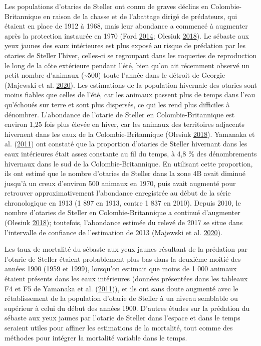 \documentclass[11pt]{book}
\begin{document}
Les populations d'otaries de Steller ont connu de graves déclins en Colombie-Britannique en raison de la chasse et de l'abattage dirigé de prédateurs, qui étaient en place de 1912 à 1968, mais leur abondance a commencé à augmenter après la protection instaurée en 1970 (Ford \protect\hyperlink{ref-ford2014}{2014}; Olesiuk \protect\hyperlink{ref-olesiuk2018}{2018}). Le sébaste aux yeux jaunes des eaux intérieures est plus exposé au risque de prédation par les otaries de Steller l'hiver, celles-ci se regroupant dans les roqueries de reproduction le long de la côte extérieure pendant l'été, bien qu'on ait récemment observé un petit nombre d'animaux (\textasciitilde500) toute l'année dans le détroit de Georgie (Majewski et al. \protect\hyperlink{ref-majewski2020}{2020}). Les estimations de la population hivernale des otaries sont moins fiables que celles de l'été, car les animaux passent plus de temps dans l'eau qu'échoués sur terre et sont plus dispersés, ce qui les rend plus difficiles à dénombrer. L'abondance de l'otarie de Steller en Colombie-Britannique est environ 1,25 fois plus élevée en hiver, car les animaux des territoires adjacents hivernent dans les eaux de la Colombie-Britannique (Olesiuk \protect\hyperlink{ref-olesiuk2018}{2018}). Yamanaka et al. (\protect\hyperlink{ref-yamanaka2011}{2011}) ont constaté que la proportion d'otaries de Steller hivernant dans les eaux intérieures était assez constante au fil du temps, à 4,8 \% des dénombrements hivernaux dans le sud de la Colombie-Britannique. En utilisant cette proportion, ils ont estimé que le nombre d'otaries de Steller dans la zone 4B avait diminué jusqu'à un creux d'environ 500 animaux en 1970, puis avait augmenté pour retrouver approximativement l'abondance enregistrée au début de la série chronologique en 1913 (1 897 en 1913, contre 1 837 en 2010). Depuis 2010, le nombre d'otaries de Steller en Colombie-Britannique a continué d'augmenter (Olesiuk \protect\hyperlink{ref-olesiuk2018}{2018}); toutefois, l'abondance estimée du relevé de 2017 se situe dans l'intervalle de confiance de l'estimation de 2013 (Majewski et al. \protect\hyperlink{ref-majewski2020}{2020}).

Les taux de mortalité du sébaste aux yeux jaunes résultant de la prédation par l'otarie de Steller étaient probablement plus bas dans la deuxième moitié des années 1900 (1959 et 1999), lorsqu'on estimait que moins de 1 000 animaux étaient présents dans les eaux intérieures (données présentées dans les tableaux F4 et F5 de Yamanaka et al. (\protect\hyperlink{ref-yamanaka2011}{2011})), et ils ont sans doute augmenté avec le rétablissement de la population d'otarie de Steller à un niveau semblable ou supérieur à celui du début des années 1900. D'autres études sur la prédation du sébaste aux yeux jaunes par l'otarie de Steller dans l'espace et dans le temps seraient utiles pour affiner les estimations de la mortalité, tout comme des méthodes pour intégrer la mortalité variable dans le temps.
\end{document}
